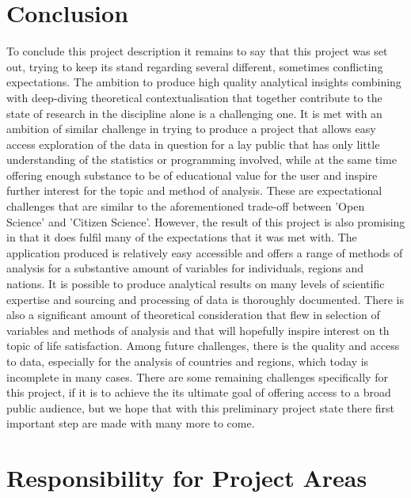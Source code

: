 \documentclass[preprint,12pt,authoryear]{elsarticle}
\begin{document}
\section{Conclusion}
To conclude this project description it remains to say that this project was set out, trying to keep its stand regarding several different, sometimes conflicting expectations. The ambition to produce high quality analytical insights combining with deep-diving theoretical contextualisation that together contribute to the state of research in the discipline alone is a challenging one. It is met with an ambition of similar challenge in trying to produce a project that allows easy access exploration of the data in question for a lay public that has only little understanding of the statistics or programming involved, while at the same time offering enough substance to be of educational value for the user and inspire further interest for the topic and method of analysis. These are expectational challenges that are similar to the aforementioned trade-off between 'Open Science' and 'Citizen Science'. However, the result of this project is also promising in that it does fulfil many of the expectations that it was met with. The application produced is relatively easy accessible and offers a range of methods of analysis for a substantive amount of variables for individuals, regions and nations. It is possible to produce analytical results on many levels of scientific expertise and sourcing and processing of data is thoroughly documented. There is also a significant amount of theoretical consideration that flew in selection of variables and methods of analysis and that will hopefully inspire interest on th topic of life satisfaction. Among future challenges, there is the quality and access to data, especially for the analysis of countries and regions, which today is incomplete in many cases. There are some remaining challenges specifically for this project, if it is to achieve the its ultimate goal of offering access to a broad public audience, but we hope that with this preliminary project state there first important step are made with many more to come.
	
\newpage
 \appendix
	
\section{Responsibility for Project Areas}
\end{document}
